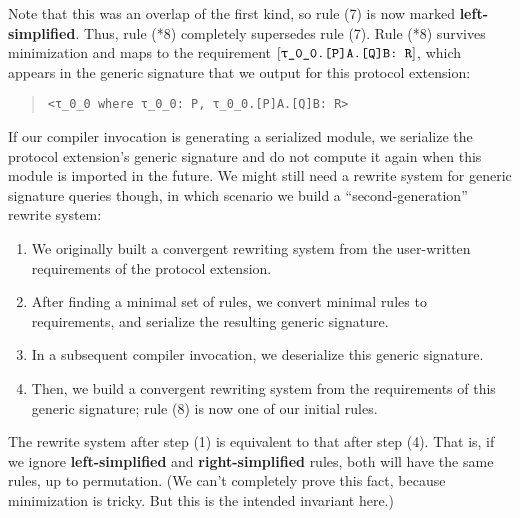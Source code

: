 \documentclass[../generics]{subfiles}
\begin{document}
\begin{example}
\begin{center}
\end{center}
Note that this was an overlap of the first kind, so rule (7) is now marked \textbf{left-simplified}. Thus, rule (*8) completely supersedes rule (7). Rule (*8) survives minimization and maps to the requirement $\ConfReq{\rT.[P]A.[Q]B}{R}$, which appears in the generic signature that we output for this protocol extension:
\begin{quote}
\begin{verbatim}
<τ_0_0 where τ_0_0: P, τ_0_0.[P]A.[Q]B: R>
\end{verbatim}
\end{quote}

If our compiler invocation is generating a serialized module, we serialize the protocol extension's generic signature and do not compute it again when this module is imported in the future. We might still need a rewrite system for generic signature queries though, in which scenario we build a ``second-generation'' rewrite system:
\begin{enumerate}
\item We originally built a convergent rewriting system from the user-written requirements of the protocol extension.
\item After finding a minimal set of rules, we convert minimal rules to requirements, and serialize the resulting generic signature.
\item In a subsequent compiler invocation, we deserialize this generic signature.
\item Then, we build a convergent rewriting system from the requirements of this generic signature; rule (8) is now one of our initial rules.
\end{enumerate}

The rewrite system after step (1) is equivalent to that after step (4). That is, if we ignore \textbf{left-simplified} and \textbf{right-simplified} rules, both will have the same rules, up to permutation. (We can't completely prove this fact, because minimization is tricky. But this is the intended invariant here.)
\end{example}
\end{document}
